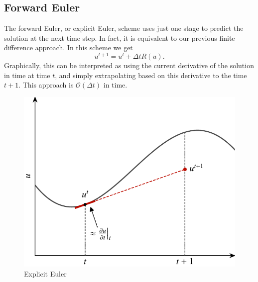 \subsection{Forward Euler}
The forward Euler, or explicit Euler, scheme uses just one stage to predict the solution at the next time step. In fact, it is equivalent to our previous finite difference approach. In this scheme we get
\begin{equation}
	u^{t+1} = u^t + \Delta t R(u).
\end{equation}
Graphically, this can be interpreted as using the current derivative of the solution in time at time $t$, and simply extrapolating based on this derivative to the time $t+1$. This approach is $\mathcal{O}(\Delta t)$ in time.
\begin{figure}[htbp]
	\centering
	\includegraphics[width=0.6\linewidth]{Pictures/explicit_euler}
	\caption{Explicit Euler}
	\label{fig:explicit_euler_method}
\end{figure}
